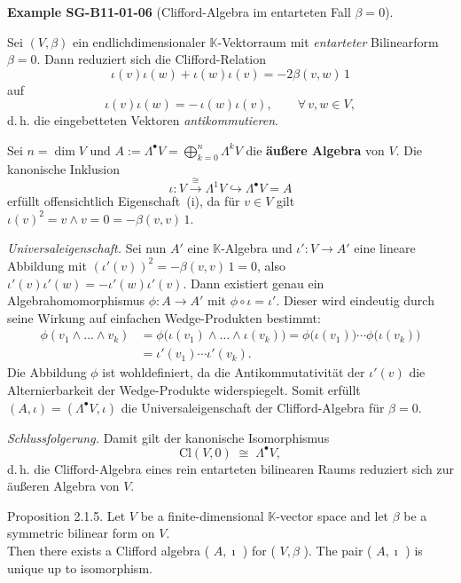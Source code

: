 \documentclass[10pt, letterpaper]{article}
\newcommand{\Cl}{\mathrm{Cl}}
\newcommand{\CustomHeading}[3]{%
  \par\medskip\noindent%
  \textbf{#1 #2} \textnormal{(#3)}.\enskip%
}
\newenvironment{EXA}[2]{\begin{unitbox}\CustomHeading{Example}{#1}{#2}}{\end{unitbox}}
\begin{document}
\begin{EXA}{SG-B11-01-06}{Clifford-Algebra im entarteten Fall \texorpdfstring{$\beta=0$}{β=0}}
Sei $(V,\beta)$ ein endlichdimensionaler $\mathbb K$-Vektorraum mit \emph{entarteter} Bilinearform 
$\beta=0$.  
Dann reduziert sich die Clifford-Relation
\[
\iota(v)\iota(w)+\iota(w)\iota(v)=-2\beta(v,w)\,1
\]
auf
\[
\iota(v)\iota(w)=-\,\iota(w)\iota(v),\qquad \forall\,v,w\in V,
\]
d.\,h. die eingebetteten Vektoren \emph{antikommutieren}.

Sei $n=\dim V$ und $A:=\Lambda^{\bullet}V=\bigoplus_{k=0}^{n}\Lambda^{k}V$
die \textbf{äußere Algebra} von $V$.  
Die kanonische Inklusion
\[
\iota:V\xrightarrow{\cong}\Lambda^{1}V\hookrightarrow\Lambda^{\bullet}V=A
\]
erfüllt offensichtlich Eigenschaft~(i), da für $v\in V$ gilt
$\iota(v)^2=v\wedge v=0=-\beta(v,v)\,1$.

\emph{Universaleigenschaft.}
Sei nun $A'$ eine $\mathbb K$-Algebra und 
$\iota':V\to A'$ eine lineare Abbildung mit $(\iota'(v))^2=-\beta(v,v)\,1=0$,
also $\iota'(v)\iota'(w)=-\iota'(w)\iota'(v)$.
Dann existiert genau ein Algebrahomomorphismus
$\phi:A\to A'$ mit $\phi\circ\iota=\iota'$.
Dieser wird eindeutig durch seine Wirkung auf einfachen Wedge-Produkten bestimmt:
\[
\begin{aligned}
\phi(v_1\wedge\dots\wedge v_k)
&=\phi\bigl(\iota(v_1)\wedge\dots\wedge\iota(v_k)\bigr)
 =\phi\bigl(\iota(v_1)\bigr)\cdots\phi\bigl(\iota(v_k)\bigr)\\
&=\iota'(v_1)\cdots\iota'(v_k).
\end{aligned}
\]
Die Abbildung $\phi$ ist wohldefiniert, da die Antikommutativität der $\iota'(v)$
die Alternierbarkeit der Wedge-Produkte widerspiegelt.
Somit erfüllt $(A,\iota)=(\Lambda^{\bullet}V,\iota)$
die Universaleigenschaft der Clifford-Algebra für $\beta=0$.

\emph{Schlussfolgerung.}
Damit gilt der kanonische Isomorphismus
\[
\Cl(V,0)\;\cong\;\Lambda^{\bullet}V,
\]
d.\,h. die Clifford-Algebra eines rein entarteten bilinearen Raums
reduziert sich zur äußeren Algebra von $V$.
\end{EXA}



Proposition 2.1.5. Let $V$ be a finite-dimensional $\mathbb{K}$-vector space and let $\beta$ be a symmetric bilinear form on $V$.\\
Then there exists a Clifford algebra ( $A, \imath$ ) for ( $V, \beta$ ). The pair ( $A, \imath$ ) is unique up to isomorphism.
\end{document}
